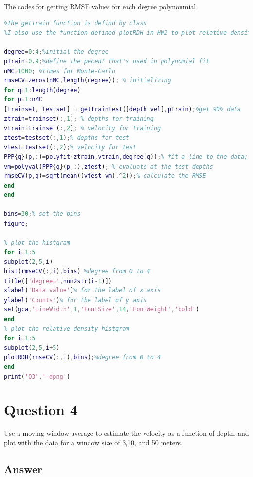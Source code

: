\documentclass[
	12pt, %
]{fphw}
\begin{document}
The codes for getting RMSE values for each degree polynonmial

\begin{lstlisting}[language=Matlab,escapeinside=``]
%I use the getTrain function in this question for convenience 
%The getTrain function is defind by class
%I also use the function defined plotRDH in HW2 to plot relative density hist

degree=0:4;%initial the degree
pTrain=0.9;%define the pecent that's used in polynomial fit
nMC=1000; %times for Monte-Carlo
rmseCV=zeros(nMC,length(degree)); % initializing
for q=1:length(degree)
for p=1:nMC
[trainset, testset] = getTrainTest([depth vel],pTrain);%get 90% data
ztrain=trainset(:,1); % depths for training
vtrain=trainset(:,2); % velocity for training
ztest=testset(:,1);% depths for test
vtest=testset(:,2);% velocity for test
PPP{q}(p,:)=polyfit(ztrain,vtrain,degree(q));% fit a line to the data;
vm=polyval(PPP{q}(p,:),ztest); % evaluate at the test depths
rmseCV(p,q)=sqrt(mean((vtest-vm).^2));% calculate the RMSE
end
end

bins=30;% set the bins
figure;

% plot the histgram 
for i=1:5
subplot(2,5,i)
hist(rmseCV(:,i),bins) %degree from 0 to 4
title(['degree=',num2str(i-1)])
xlabel('Data value')% for the label of x axis
ylabel('Counts')% for the label of y axis
set(gca,'LineWidth',1,'FontSize',14,'FontWeight','bold')
end
% plot the relative density histgram 
for i=1:5
subplot(2,5,i+5)
plotRDH(rmseCV(:,i),bins);%degree from 0 to 4
end
print('Q3','-dpng')
\end{lstlisting}




\clearpage
\section*{Question 4 }

\begin{problem}
Use a moving window average to estimate the velocity as a function of depth, and plot with the data for a
window size of 3,10, and 50 meters.
\end{problem}


\subsection*{Answer}
\end{document}
